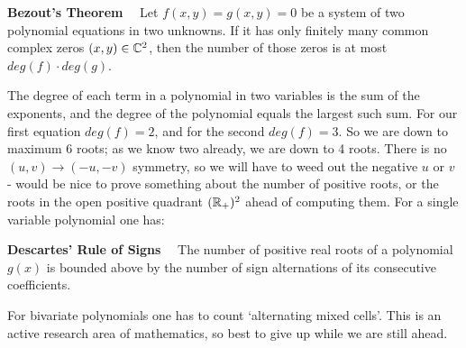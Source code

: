 \begin{description}
{\bf Bezout's Theorem}~~ Let $f(x, y) = g(x, y) = 0$ be a system of two
polynomial equations in two unknowns. If it has only finitely many common
complex zeros $(x, y) \in \mathbb{C}^2$, then the number of those zeros is
at most $deg(f) \cdot deg(g)$.

The degree of each term in a polynomial in two variables is the sum of
the exponents, and the degree of the polynomial equals the largest such
sum. For our first equation $deg(f) = 2$, and for the second $deg(f) =
3$. So we are down to maximum 6 roots; as we know two already, we are
down to 4 roots. There is no $(u,v) \to (-u,-v)$ symmetry, so we will
have to weed out the negative $u$ or $v$ - would be nice to prove
something about the number of positive roots, or the roots in the open
positive quadrant $(\mathbb{R}_+)^2$ ahead of computing them.
For a single variable polynomial one has:

{\bf Descartes' Rule of Signs}~~ The number of positive real roots of a
polynomial $g(x)$ is bounded above by the number of sign alternations of
its consecutive coefficients.

For bivariate  polynomials one has to count `alternating mixed cells'.
This is an active research area of mathematics, so best to give up while
we are still ahead.

\end{description}
